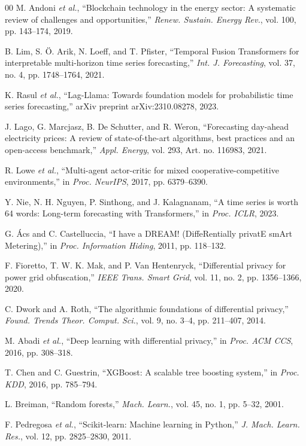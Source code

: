 \documentclass{ieeeaccess}
\begin{document}
\begin{thebibliography}{00}
 M. Andoni \emph{et al.}, ``Blockchain technology in the energy sector: A systematic review of challenges and opportunities,'' \emph{Renew. Sustain. Energy Rev.}, vol. 100, pp. 143--174, 2019.

 B. Lim, S. \"{O}. Arik, N. Loeff, and T. Pfister, ``Temporal Fusion Transformers for interpretable multi-horizon time series forecasting,'' \emph{Int. J. Forecasting}, vol. 37, no. 4, pp. 1748--1764, 2021.

 K. Rasul \emph{et al.}, ``Lag-Llama: Towards foundation models for probabilistic time series forecasting,'' arXiv preprint arXiv:2310.08278, 2023.

 J. Lago, G. Marcjasz, B. De Schutter, and R. Weron, ``Forecasting day-ahead electricity prices: A review of state-of-the-art algorithms, best practices and an open-access benchmark,'' \emph{Appl. Energy}, vol. 293, Art. no. 116983, 2021.

 R. Lowe \emph{et al.}, ``Multi-agent actor-critic for mixed cooperative-competitive environments,'' in \emph{Proc. NeurIPS}, 2017, pp. 6379--6390.

 Y. Nie, N. H. Nguyen, P. Sinthong, and J. Kalagnanam, ``A time series is worth 64 words: Long-term forecasting with Transformers,'' in \emph{Proc. ICLR}, 2023.

 G. \'{A}cs and C. Castelluccia, ``I have a DREAM! (DiffeRentially privatE smArt Metering),'' in \emph{Proc. Information Hiding}, 2011, pp. 118--132.

 F. Fioretto, T. W. K. Mak, and P. Van Hentenryck, ``Differential privacy for power grid obfuscation,'' \emph{IEEE Trans. Smart Grid}, vol. 11, no. 2, pp. 1356--1366, 2020.

 C. Dwork and A. Roth, ``The algorithmic foundations of differential privacy,'' \emph{Found. Trends Theor. Comput. Sci.}, vol. 9, no. 3--4, pp. 211--407, 2014.

 M. Abadi \emph{et al.}, ``Deep learning with differential privacy,'' in \emph{Proc. ACM CCS}, 2016, pp. 308--318.

 T. Chen and C. Guestrin, ``XGBoost: A scalable tree boosting system,'' in \emph{Proc. KDD}, 2016, pp. 785--794.

 L. Breiman, ``Random forests,'' \emph{Mach. Learn.}, vol. 45, no. 1, pp. 5--32, 2001.

 F. Pedregosa \emph{et al.}, ``Scikit-learn: Machine learning in Python,'' \emph{J. Mach. Learn. Res.}, vol. 12, pp. 2825--2830, 2011.


\end{thebibliography}
\end{document}
